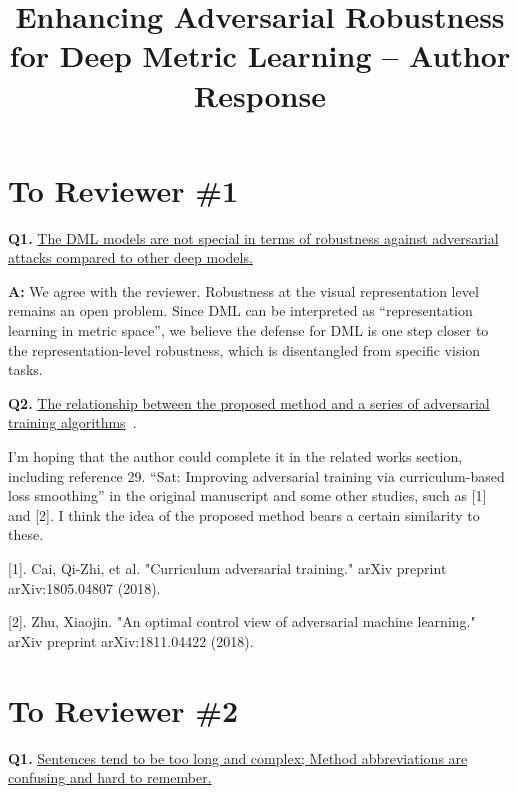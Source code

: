 \documentclass[10pt,twocolumn,letterpaper]{article}
\begin{document}
\title{Enhancing Adversarial Robustness for Deep Metric Learning -- Author Response}  %

\maketitle
\thispagestyle{empty}
\appendix

\section*{To Reviewer \#1}

\noindent\textbf{Q1.}
%
\ul{
The DML models are not special in terms of robustness against
adversarial attacks compared to other deep models.
}

\noindent\textbf{A:} 
%
We agree with the reviewer. Robustness at the visual representation
level remains an open problem. Since DML can be
interpreted as ``representation learning in metric space'', we believe the
defense for DML is one step closer to the representation-level robustness,
which is disentangled from specific vision tasks.

\noindent\textbf{Q2.}
%
\ul{
The relationship between the proposed method and a series of
adversarial training algorithms}~\cite{smoothat,currat,optcontrolaml}.

\cite{smoothat}

I’m hoping that the author could complete it in the related works section,
including reference 29. “Sat: Improving adversarial training via
curriculum-based loss smoothing” in the original manuscript and some other
studies, such as [1] and [2]. I think the idea of the proposed method bears a
certain similarity to these.

[1]. Cai, Qi-Zhi, et al. "Curriculum adversarial training." arXiv preprint arXiv:1805.04807 (2018).
\cite{currat}

[2]. Zhu, Xiaojin. "An optimal control view of adversarial machine learning." arXiv preprint arXiv:1811.04422 (2018). \cite{optcontrolaml}

\section*{To Reviewer \#2}

\noindent\textbf{Q1.}
%
\ul{
Sentences tend to be too long and complex; Method abbreviations are confusing
and hard to remember.
}
\end{document}
